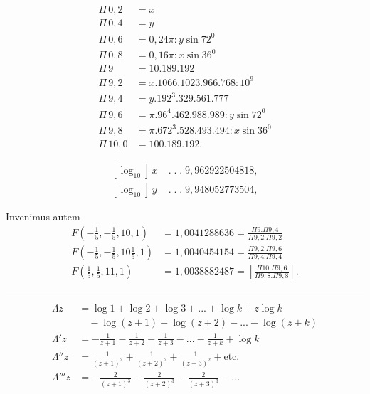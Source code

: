 \begingroup
\clearpage{}
\noindent{\small[S. 244]}\par
\[\begin{aligned}
\Pi\,0{,}2&=x\\
\Pi\,0{,}4&=y\\
\Pi\,0{,}6&=0{,}24\pi:y\sin72^0\\
\Pi\,0{,}8&=0{,}16\pi:x\sin36^0\\
\Pi\,9&=10{.}189{.}192\\
\Pi\,9{,}2&=x{.}1066{.}1023{.}966{.}768:10^9\\
\Pi\,9{,}4&=y{.}192^3{.}329{.}561{.}777\\
\Pi\,9{,}6&=\pi{.}96^4{.}462{.}988{.}989:y\sin72^0\\
\Pi\,9{,}8&=\pi{.}672^3{.}528{.}493{.}494:x\sin36^0\\
\Pi\,10{,}0&=100{.}189{.}192.
\end{aligned}\]
\par{}
\[\begin{aligned}
[\log_{10}]\,x\;&{.}\;{.}\;{.}\;9{,}962922504818,\\
{}[\log_{10}]\,y\;&{.}\;{.}\;{.}\;9{,}948052773504,
\end{aligned}\]
\par\indent Invenimus autem
\[\begin{aligned}
F(-\tfrac15,-\tfrac15,10,1)&=1{,}0041288636
=\frac{\Pi9{.}\Pi9{,}4}{\Pi9{,}2{.}\Pi9{,}2}\\[.8em]
F(-\tfrac15,-\tfrac15,10\tfrac15,1)&=1{,}0040454154
=\frac{\Pi9{,}2{.}\Pi9{,}6}{\Pi9{,}4{.}\Pi9{,}4}\\[.8em]
F(\tfrac15,\tfrac15,11,1)&=1{,}0038882487
=\left[\frac{\Pi10{.}\Pi9{,}6}{\Pi9{,}8{.}\Pi9{,}8}\right].
\end{aligned}\]
\begin{center}\rule{.22\linewidth}{.4pt}\end{center}
\[\begin{aligned}
\Lambda z&=\log1+\log2+\log3+{.}{.}{.}+\log k+z\log k\\
&\quad-\log(z+1)-\log(z+2)-{.}{.}{.}-\log(z+k)\\[.8em]
\Lambda'z&=-\frac1{z+1}-\frac1{z+2}-\frac1{z+3}-{.}{.}{.}-\frac1{z+k}+\log k\\[.8em]
\Lambda''z&=\frac1{(z+1)^2}+\frac1{(z+2)^2}+\frac1{(z+3)^2}+\text{etc.}\\[.8em]
\Lambda'''z&=-\frac2{(z+1)^3}-\frac2{(z+2)^3}-\frac2{(z+3)^3}-{.}{.}{.}
\end{aligned}\]
